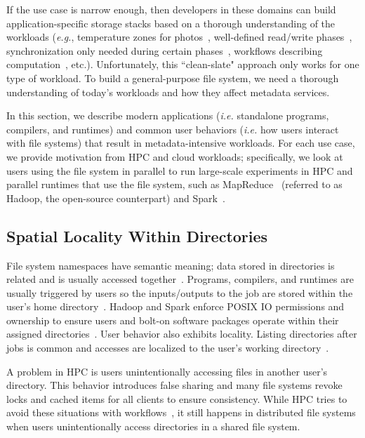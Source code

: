 If the use case is narrow enough, then developers in these domains can build
application-specific storage stacks based on a thorough understanding of the
workloads ({\it e.g.}, temperature zones for
photos~\cite{muralidhar:osdi2014-f4}, well-defined read/write
phases~\cite{dean:osdi2004-mapreduce, dean_evolution_2010}, synchronization
only needed during certain phases~\cite{hakimzadeh:dais14-hdfs-consistency,
zheng:pdsw2015-deltafs}, workflows describing computation~\cite{yoo_slurm_2003,
gamblin_spack_2015}, etc.). Unfortunately, this ``clean-slate" approach only
works for one type of workload. To build a general-purpose file system, we need
a thorough understanding of today's workloads and how they affect metadata
services.  

In this section, we describe modern applications ({\it i.e.} standalone
programs, compilers, and runtimes) and common user behaviors ({\it i.e.} how
users interact with file systems) that result in metadata-intensive workloads.
For each use case, we provide motivation from HPC and cloud workloads;
specifically, we look at users using the file system in parallel to run
large-scale experiments in HPC and parallel runtimes that use the file system,
such as MapReduce~\cite{dean:osdi2004-mapreduce} (referred to as Hadoop, the
open-source counterpart) and Spark~\cite{zaharia:nsdi2012-spark}.

\subsection{Spatial Locality Within Directories}
\label{sec:spatial-locality-within-directories}

File system namespaces have semantic meaning; data stored in directories is
related and is usually accessed together~\cite{weil:osdi2006-ceph,
weil:sc2004-dyn-metadata}. Programs, compilers, and runtimes are usually
triggered by users so the inputs/outputs to the job are stored within the
user's home directory~\cite{weil:phdthesis07}. Hadoop and Spark enforce POSIX
IO permissions and ownership to ensure users and bolt-on software packages
operate within their assigned directories~\cite{docs:hadoopperm}.  User
behavior also exhibits locality. Listing directories after jobs is common and
accesses are localized to the user's working
directory~\cite{roselli:atec2000-FS-workloads, abad:ucc2012-mimesis}.

A problem in HPC is users unintentionally accessing files in another user's
directory. This behavior introduces false sharing and many file systems revoke
locks and cached items for all clients to ensure consistency. While HPC tries
to avoid these situations with workflows~\cite{zheng:pdsw2014-batchfs,
zheng:pdsw2015-deltafs}, it still happens in distributed file systems when
users unintentionally access directories in a shared file system. 

